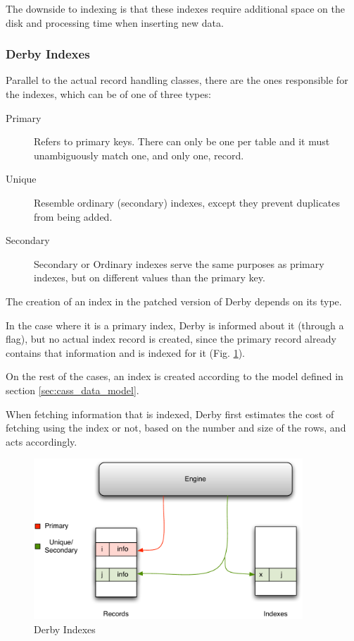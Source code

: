The downside to indexing is that these indexes require additional space on the disk and processing time when inserting new data.

\subsubsection{Derby Indexes}
Parallel to the actual record handling classes, there are the ones responsible for the indexes, which can be of one of three types:

\begin{description}
	\item[Primary] Refers to primary keys. There can only be one per table and it must unambiguously match one, and only one, record.
	\item[Unique] Resemble ordinary (secondary) indexes, except they prevent duplicates from being added.
	\item[Secondary] Secondary or Ordinary indexes serve the same purposes as primary indexes, but on different values than the primary key.
\end{description} 

The creation of an index in the patched version of Derby depends on its type. 

In the case where it is a primary index, Derby is informed about it (through a flag), but no actual index record is created, since the primary record already contains that information and is indexed for it (Fig. \ref{fig:derbyindexes}).

On the rest of the cases, an index is created according to the model defined in section \ref{sec:cass_data_model}.

When fetching information that is indexed, Derby first estimates the cost of fetching using the index or not, based on the number and size of the rows, and acts accordingly.

\begin{figure}[!h]
  \centering    
  \includegraphics[width=0.9\textwidth]{images/derbyindexes}
  \caption{Derby Indexes}
  \label{fig:derbyindexes}
\end{figure}


